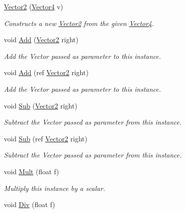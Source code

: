 \begin{DoxyCompactItemize}
\hyperlink{struct_open_t_k_1_1_vector2_a3b5e7982620bc13839f34edf289ccd4c}{Vector2} (\hyperlink{struct_open_t_k_1_1_vector4}{Vector4} v)
\begin{DoxyCompactList}\small\item\em Constructs a new \hyperlink{struct_open_t_k_1_1_vector2}{Vector2} from the given \hyperlink{struct_open_t_k_1_1_vector4}{Vector4}. \end{DoxyCompactList}\item 
void \hyperlink{struct_open_t_k_1_1_vector2_adf3319b0fd844c99ccce081fbcd10bb5}{Add} (\hyperlink{struct_open_t_k_1_1_vector2}{Vector2} right)
\begin{DoxyCompactList}\small\item\em Add the Vector passed as parameter to this instance.\end{DoxyCompactList}\item 
void \hyperlink{struct_open_t_k_1_1_vector2_a5e538a565b3be8c3d2379e2a9ee2121a}{Add} (ref \hyperlink{struct_open_t_k_1_1_vector2}{Vector2} right)
\begin{DoxyCompactList}\small\item\em Add the Vector passed as parameter to this instance.\end{DoxyCompactList}\item 
void \hyperlink{struct_open_t_k_1_1_vector2_a550acc9c500c3be18e7df36881222d08}{Sub} (\hyperlink{struct_open_t_k_1_1_vector2}{Vector2} right)
\begin{DoxyCompactList}\small\item\em Subtract the Vector passed as parameter from this instance.\end{DoxyCompactList}\item 
void \hyperlink{struct_open_t_k_1_1_vector2_a82b82216a0d97df9caeb0578440af577}{Sub} (ref \hyperlink{struct_open_t_k_1_1_vector2}{Vector2} right)
\begin{DoxyCompactList}\small\item\em Subtract the Vector passed as parameter from this instance.\end{DoxyCompactList}\item 
void \hyperlink{struct_open_t_k_1_1_vector2_aff594d3078110196ae2421fcaf5bced2}{Mult} (float f)
\begin{DoxyCompactList}\small\item\em Multiply this instance by a scalar.\end{DoxyCompactList}\item 
void \hyperlink{struct_open_t_k_1_1_vector2_aa60747bd803334f27e4e685db35f4428}{Div} (float f)

\end{DoxyCompactItemize}
